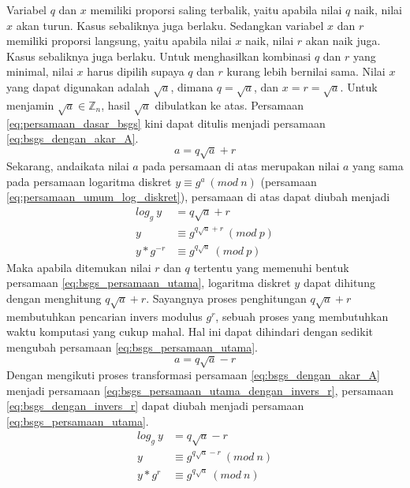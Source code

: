 Variabel $ q $ dan $ x $ memiliki proporsi saling terbalik, yaitu apabila nilai $ q $ naik, nilai $ x $ akan turun. Kasus sebaliknya juga berlaku. Sedangkan variabel $ x $ dan $ r $ memiliki proporsi langsung, yaitu apabila nilai $ x $ naik, nilai $ r $ akan naik juga. Kasus sebaliknya juga berlaku. Untuk menghasilkan kombinasi $ q $ dan $ r $ yang minimal, nilai $ x $ harus dipilih supaya $ q $ dan $ r $ kurang lebih bernilai sama. Nilai $ x $ yang dapat digunakan adalah $ \sqrt{a} $, dimana $ q=\sqrt{a} $, dan $ x=r=\sqrt{a} $. Untuk menjamin $ \sqrt{a} \in \mathbb{Z}_n $, hasil $ \sqrt{a} $ dibulatkan ke atas. Persamaan \eqref{eq:persamaan_dasar_bsgs} kini dapat ditulis menjadi persamaan \eqref{eq:bsgs_dengan_akar_A}.
\begin{equation}
a=q\sqrt{a}+r
\label{eq:bsgs_dengan_akar_A}
\end{equation}
Sekarang, andaikata nilai $ a $ pada persamaan di atas merupakan nilai $ a $ yang sama pada persamaan logaritma diskret $ y \equiv g^a\ (mod\ n) $ (persamaan \eqref{eq:persamaan_umum_log_diskret}), persamaan di atas dapat diubah menjadi
\begin{align}
log_{g}\ y &= q\sqrt{a}+r \\
y &\equiv g^{q\sqrt{a}+r}\ (mod\ p) \\
y*g^{-r} &\equiv g^{q\sqrt{a}}\ (mod\ p)
\label{eq:bsgs_persamaan_utama_dengan_invers_r}
\end{align}
Maka apabila ditemukan nilai $ r $ dan $ q $ tertentu yang memenuhi bentuk persamaan \eqref{eq:bsgs_persamaan_utama}, logaritma diskret $ y $ dapat dihitung dengan menghitung $ q\sqrt{a}+r $. Sayangnya proses penghitungan $ q\sqrt{a}+r $ membutuhkan pencarian invers modulus $ g^r $, sebuah proses yang membutuhkan waktu komputasi yang cukup mahal. Hal ini dapat dihindari dengan sedikit mengubah persamaan \eqref{eq:bsgs_persamaan_utama}.
\begin{equation}
a=q\sqrt{a}-r
\label{eq:bsgs_dengan_invers_r}
\end{equation}
Dengan mengikuti proses transformasi persamaan \eqref{eq:bsgs_dengan_akar_A} menjadi persamaan \eqref{eq:bsgs_persamaan_utama_dengan_invers_r}, persamaan \eqref{eq:bsgs_dengan_invers_r} dapat diubah menjadi persamaan \eqref{eq:bsgs_persamaan_utama}.
\begin{align}
log_{g}\ y &= q\sqrt{a} - r \\
y &\equiv g^{q\sqrt{a} - r}\ (mod\ n) \\
y*g^r &\equiv g^{q\sqrt{a}}\ (mod\ n)
\label{eq:bsgs_persamaan_utama}
\end{align}
